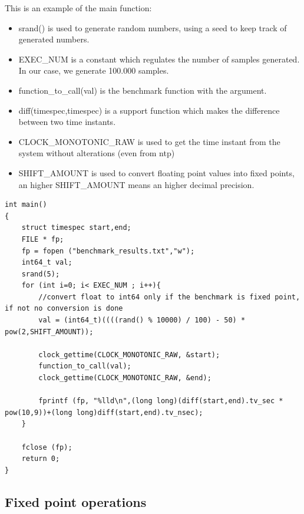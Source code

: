 This is an example of the main function:
\begin{itemize}
	\item srand() is used to generate random numbers, using a seed to keep track of generated numbers.
	\item EXEC\_NUM is a constant which regulates the number of samples generated. In our case, we generate 100.000 samples.
	\item function\_to\_call(val) is the benchmark function with the argument.
	\item diff(timespec,timespec) is a support function which makes the difference between two time instants.
	\item CLOCK\_MONOTONIC\_RAW is used to get the time instant from the system without alterations (even from ntp)
	\item SHIFT\_AMOUNT is used to convert floating point values into fixed points, an higher SHIFT\_AMOUNT means an higher decimal precision.
\end{itemize}
\begin{lstlisting}
int main()
{
	struct timespec start,end;
	FILE * fp;
	fp = fopen ("benchmark_results.txt","w");
	int64_t val;
	srand(5);
	for (int i=0; i< EXEC_NUM ; i++){
		//convert float to int64 only if the benchmark is fixed point, if not no conversion is done
		val = (int64_t)((((rand() % 10000) / 100) - 50) * pow(2,SHIFT_AMOUNT));
		
		clock_gettime(CLOCK_MONOTONIC_RAW, &start);
		function_to_call(val);
		clock_gettime(CLOCK_MONOTONIC_RAW, &end);
		
		fprintf (fp, "%lld\n",(long long)(diff(start,end).tv_sec * pow(10,9))+(long long)diff(start,end).tv_nsec);
	}
	
	fclose (fp);
	return 0;
}
\end{lstlisting}

\subsection{Fixed point operations}

